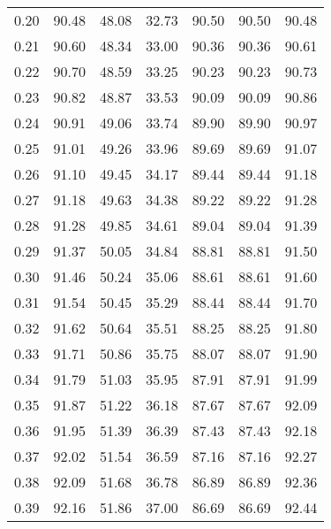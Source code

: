 \begin{tabular}{|c|c|c|c|c|c|c|}
      0.20 &     90.48 &     48.08 &      32.73 &   90.50 &      90.50 &         90.48 \\
      0.21 &     90.60 &     48.34 &      33.00 &   90.36 &      90.36 &         90.61 \\
      0.22 &     90.70 &     48.59 &      33.25 &   90.23 &      90.23 &         90.73 \\
      0.23 &     90.82 &     48.87 &      33.53 &   90.09 &      90.09 &         90.86 \\
      0.24 &     90.91 &     49.06 &      33.74 &   89.90 &      89.90 &         90.97 \\
      0.25 &     91.01 &     49.26 &      33.96 &   89.69 &      89.69 &         91.07 \\
      0.26 &     91.10 &     49.45 &      34.17 &   89.44 &      89.44 &         91.18 \\
      0.27 &     91.18 &     49.63 &      34.38 &   89.22 &      89.22 &         91.28 \\
      0.28 &     91.28 &     49.85 &      34.61 &   89.04 &      89.04 &         91.39 \\
      0.29 &     91.37 &     50.05 &      34.84 &   88.81 &      88.81 &         91.50 \\
      0.30 &     91.46 &     50.24 &      35.06 &   88.61 &      88.61 &         91.60 \\
      0.31 &     91.54 &     50.45 &      35.29 &   88.44 &      88.44 &         91.70 \\
      0.32 &     91.62 &     50.64 &      35.51 &   88.25 &      88.25 &         91.80 \\
      0.33 &     91.71 &     50.86 &      35.75 &   88.07 &      88.07 &         91.90 \\
      0.34 &     91.79 &     51.03 &      35.95 &   87.91 &      87.91 &         91.99 \\
      0.35 &     91.87 &     51.22 &      36.18 &   87.67 &      87.67 &         92.09 \\
      0.36 &     91.95 &     51.39 &      36.39 &   87.43 &      87.43 &         92.18 \\
      0.37 &     92.02 &     51.54 &      36.59 &   87.16 &      87.16 &         92.27 \\
      0.38 &     92.09 &     51.68 &      36.78 &   86.89 &      86.89 &         92.36 \\
      0.39 &     92.16 &     51.86 &      37.00 &   86.69 &      86.69 &         92.44 \\

\end{tabular}
